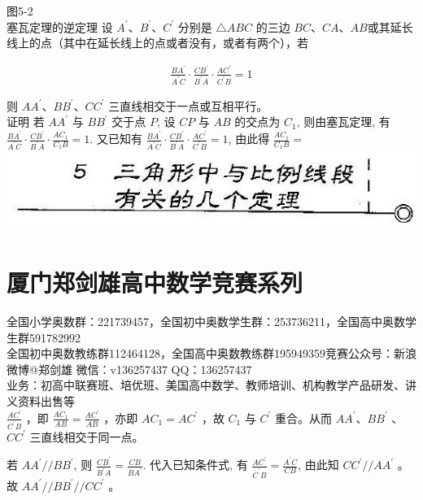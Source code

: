 \documentclass[10pt]{article}
\begin{document}
图5-2\\
塞瓦定理的逆定理 设 $A^{\prime} 、 B^{\prime} 、 C^{\prime}$ 分别是 $\triangle A B C$ 的三边 $B C 、 C A 、 A B$或其延长线上的点（其中在延长线上的点或者没有，或者有两个），若

\begin{align*}
\frac{B A^{\prime}}{A^{\prime} C} \cdot \frac{C B^{\prime}}{B^{\prime} A} \cdot \frac{A C^{\prime}}{C^{\prime} B}=1 \tag{5-4}
\end{align*}

则 $A A^{\prime} 、 B B^{\prime} 、 C C^{\prime}$ 三直线相交于一点或互相平行。\\
证明 若 $A A^{\prime}$ 与 $B B^{\prime}$ 交于点 $P$, 设 $C P$ 与 $A B$ 的交点为 $C_{1}$, 则由塞瓦定理, 有 $\frac{B A^{\prime}}{A^{\prime} C} \cdot \frac{C B^{\prime}}{B^{\prime} A} \cdot \frac{A C_{1}}{C_{1} B}=1$. 又已知有 $\frac{B A^{\prime}}{A^{\prime} C} \cdot \frac{C B^{\prime}}{B^{\prime} A} \cdot \frac{A C^{\prime}}{C^{\prime} B}=1$, 由此得 $\frac{A C_{1}}{C_{1} B}=$\\
\includegraphics[max width=\textwidth, center]{2024_10_30_2c8f45efd4a519b08e1ag-047}

\section*{厦门郑剑雄高中数学竞赛系列}
全国小学奥数群：221739457，全国初中奥数学生群：253736211，全国高中奥数学生群591782992\\
全国初中奥数教练群112464128，全国高中奥数教练群195949359竞赛公众号：新浪微博@郑剑雄 微信：v136257437 QQ：136257437\\
业务：初高中联赛班、培优班、美国高中数学、教师培训、机构教学产品研发、讲义资料出售等\\
$\frac{A C^{\prime}}{C^{\prime} B}$ ，即 $\frac{A C_{1}}{A B}=\frac{A C^{\prime}}{A B}$ ，亦即 $A C_{1}=A C^{\prime}$ ，故 $C_{1}$ 与 $C^{\prime}$ 重合。从而 $A A^{\prime} 、 B B^{\prime}$ 、 $C C^{\prime}$ 三直线相交于同一点。

若 $A A^{\prime} / / B B^{\prime}$, 则 $\frac{C B^{\prime}}{B^{\prime} A}=\frac{C B}{B A^{\prime}}$. 代入已知条件式, 有 $\frac{A C^{\prime}}{\bar{C}^{\prime} B}=\frac{A^{\prime} C}{C B}$, 由此知 $C C^{\prime} / / A A^{\prime}$ 。故 $A A^{\prime} / / B B^{\prime} / / C C^{\prime}$ 。
\end{document}
